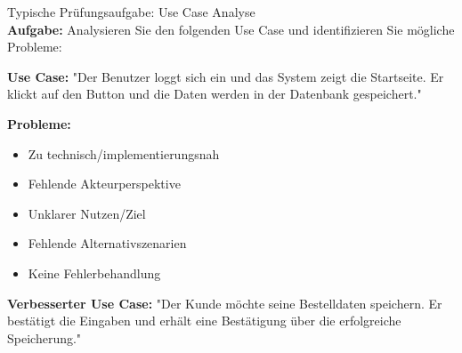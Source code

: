 \begin{example2}{Typische Prüfungsaufgabe: Use Case Analyse}\\
\textbf{Aufgabe:} Analysieren Sie den folgenden Use Case und identifizieren Sie mögliche Probleme:

\textbf{Use Case:} "Der Benutzer loggt sich ein und das System zeigt die Startseite. Er klickt auf den Button und die Daten werden in der Datenbank gespeichert."

\textbf{Probleme:}
\begin{itemize}
    \item Zu technisch/implementierungsnah
    \item Fehlende Akteurperspektive
    \item Unklarer Nutzen/Ziel
    \item Fehlende Alternativszenarien
    \item Keine Fehlerbehandlung
\end{itemize}

\textbf{Verbesserter Use Case:}
"Der Kunde möchte seine Bestelldaten speichern. Er bestätigt die Eingaben und erhält eine Bestätigung über die erfolgreiche Speicherung."
\end{example2}

